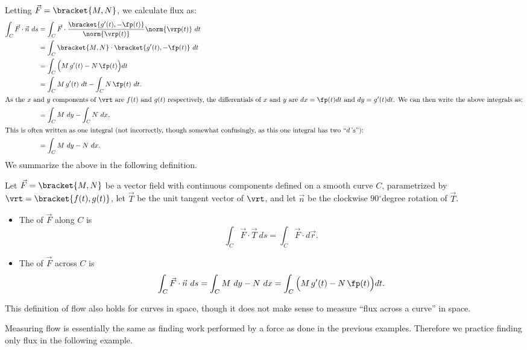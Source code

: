 Letting $\vec F =\bracket{M,N}$, we calculate flux as:
\begin{align*}
\int_C \vec F\cdot \vec n\ ds &= \int_C \vec F\cdot \frac{\bracket{g'(t),-\fp(t)}}{\norm{\vrp(t)}} \norm{\vrp(t)}\ dt \\
				&= \int_C\bracket{M,N}\cdot\bracket{g'(t),-\fp(t)}\ dt \\
				&= \int_C \Big(M\,g'(t) - N\,\fp(t)\Big)dt\\
				&= \int_C M\,g'(t)\ dt - \int_C N\,\fp(t)\ dt.\\
				\intertext{As the $x$ and $y$ components of $\vrt$ are $f(t)$ and $g(t)$ respectively, the differentials of $x$ and $y$ are $dx = \fp(t)dt$ and $dy=g'(t)dt$. We can then write the above integrals as:}
				&= \int_C M\ dy - \int_C N\ dx.\\
				\intertext{This is often written as one integral (not incorrectly, though somewhat confusingly, as this one integral has two ``$d$\,'s''):}
				&=\int_CM\ dy -N\ dx.
\end{align*}
We summarize the above in the following definition.

{Let $\vec F=\bracket{M,N}$ be a vector field with continuous components defined on a smooth curve $C$, parametrized by $\vrt =\bracket{f(t),g(t)}$, let $\vec T$ be the unit tangent vector of $\vrt$, and let $\vec n$ be the clockwise 90$^\circ$degree rotation of $\vec T$.
\begin{itemize}
	\item The  of $\vec F$ along $C$ is
\[\int_C \vec F\cdot\vec T\ ds=\int_C \vec F\cdot d\vec r.\]
	\item The  of $\vec F$ across $C$ is
\[
\int_C \vec F\cdot \vec n\ ds =  \int_C M\ dy -N\ dx = \int_C\Big(M\,g'(t) - N\,\fp(t)\Big)dt.
\]
\end{itemize}}

This definition of flow also holds for curves in space, though it does not make sense to measure ``flux across a curve'' in space.

Measuring flow is essentially the same as finding work performed by a force as done in the previous examples. Therefore we practice finding only flux in the following example.

